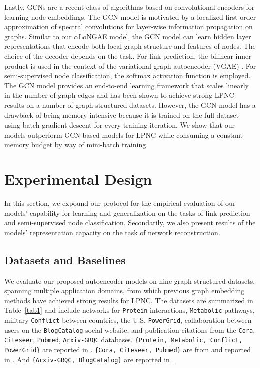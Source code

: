 \documentclass[letterpaper, conference]{IEEEtran}
\begin{document}
Lastly, GCNs \cite{Kipf:2016} are a recent class of algorithms based on convolutional encoders for learning node embeddings. The GCN model is motivated by a localized first-order approximation of spectral convolutions for layer-wise information propagation on graphs. Similar to our $\alpha$LoNGAE model, the GCN model can learn hidden layer representations that encode both local graph structure and features of nodes. The choice of the decoder depends on the task. For link prediction, the bilinear inner product is used in the context of the variational graph autoencoder (VGAE) \cite{VGAE:2016}. For semi-supervised node classification, the softmax activation function is employed. The GCN model provides an end-to-end learning framework that scales linearly in the number of graph edges and has been shown to achieve strong LPNC results on a number of graph-structured datasets. However, the GCN model has a drawback of being memory intensive because it is trained on the full dataset using batch gradient descent for every training iteration. We show that our models outperform GCN-based models for LPNC while consuming a constant memory budget by way of mini-batch training.

\section{Experimental Design}
In this section, we expound our protocol for the empirical evaluation of our models' capability for learning and generalization on the tasks of link prediction and semi-supervised node classification. Secondarily, we also present results of the models' representation capacity on the task of network reconstruction.

\subsection{Datasets and Baselines}
We evaluate our proposed autoencoder models on nine graph-structured datasets, spanning multiple application domains, from which previous graph embedding methods have achieved strong results for LPNC. The datasets are summarized in Table~\ref{tab1} and include networks for \texttt{Protein} interactions, \texttt{Metabolic} pathways, military \texttt{Conflict} between countries, the U.S. \texttt{PowerGrid}, collaboration between users on the \texttt{BlogCatalog} social website, and publication citations from the \texttt{Cora}, \texttt{Citeseer}, \texttt{Pubmed}, \texttt{Arxiv-GRQC} databases. \texttt{\{Protein, Metabolic, Conflict, PowerGrid\}} are reported in \cite{Menon:2011}. \texttt{\{Cora, Citeseer, Pubmed\}} are from \cite{Sen:2008} and reported in \cite{Kipf:2016,VGAE:2016}. And \texttt{\{Arxiv-GRQC, BlogCatalog\}} are reported in \cite{Wang:2016}.
\end{document}
